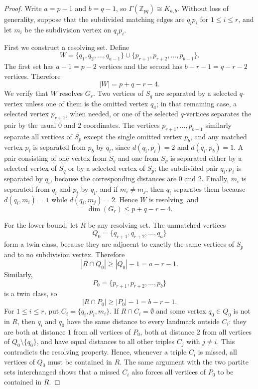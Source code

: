 \documentclass[10pt,a4paper]{amsart}
\begin{document}
\begin{proof}
Write $a=p-1$ and $b=q-1$, so $\Gamma(\mathbb Z_{pq})\cong K_{a,b}$. Without loss of generality, suppose that the subdivided matching edges are $q_ip_i$ for $1\leq i\leq r$, and let $m_i$ be the subdivision vertex on $q_ip_i$.

First we construct a resolving set. Define
$$
W=\{q_1,q_2,\ldots,q_{a-1}\}\cup\{p_{r+1},p_{r+2},\ldots,p_{b-1}\}.
$$
The first set has $a-1=p-2$ vertices and the second has $b-r-1=q-r-2$ vertices. Therefore
$$
|W|=p+q-r-4.
$$
We verify that $W$ resolves $G_r$. Two vertices of $S_q$ are separated by a selected $q$-vertex unless one of them is the omitted vertex $q_a$; in that remaining case, a selected vertex $p_{r+1}$, when needed, or one of the selected $q$-vertices separates the pair by the usual $0$ and $2$ coordinates. The vertices $p_{r+1},\ldots,p_{b-1}$ similarly separate all vertices of $S_p$ except the single omitted vertex $p_b$, and any matched vertex $p_i$ is separated from $p_b$ by $q_i$, since $d(q_i,p_i)=2$ and $d(q_i,p_b)=1$. A pair consisting of one vertex from $S_q$ and one from $S_p$ is separated either by a selected vertex of $S_q$ or by a selected vertex of $S_p$; the subdivided pair $q_i,p_i$ is separated by $q_i$, because the corresponding distances are $0$ and $2$. Finally, $m_i$ is separated from $q_i$ and $p_i$ by $q_i$, and if $m_i\neq m_j$, then $q_i$ separates them because $d(q_i,m_i)=1$ while $d(q_i,m_j)=2$. Hence $W$ is resolving, and
$$
\dim(G_r)\leq p+q-r-4.
$$

For the lower bound, let $R$ be any resolving set. The unmatched vertices
$$
Q_0=\{q_{r+1},q_{r+2},\ldots,q_a\}
$$
form a twin class, because they are adjacent to exactly the same vertices of $S_p$ and to no subdivision vertex. Therefore
$$
|R\cap Q_0|\geq |Q_0|-1=a-r-1.
$$
Similarly,
$$
P_0=\{p_{r+1},p_{r+2},\ldots,p_b\}
$$
is a twin class, so
$$
|R\cap P_0|\geq |P_0|-1=b-r-1.
$$
For $1\leq i\leq r$, put $C_i=\{q_i,p_i,m_i\}$. If $R\cap C_i=\emptyset$ and some vertex $q_0\in Q_0$ is not in $R$, then $q_i$ and $q_0$ have the same distance to every landmark outside $C_i$: they are both at distance $1$ from all vertices of $P_0$, both at distance $2$ from all vertices of $Q_0\setminus\{q_0\}$, and have equal distances to all other triples $C_j$ with $j\neq i$. This contradicts the resolving property. Hence, whenever a triple $C_i$ is missed, all vertices of $Q_0$ must be contained in $R$. The same argument with the two partite sets interchanged shows that a missed $C_i$ also forces all vertices of $P_0$ to be contained in $R$.


\end{proof}
\end{document}
